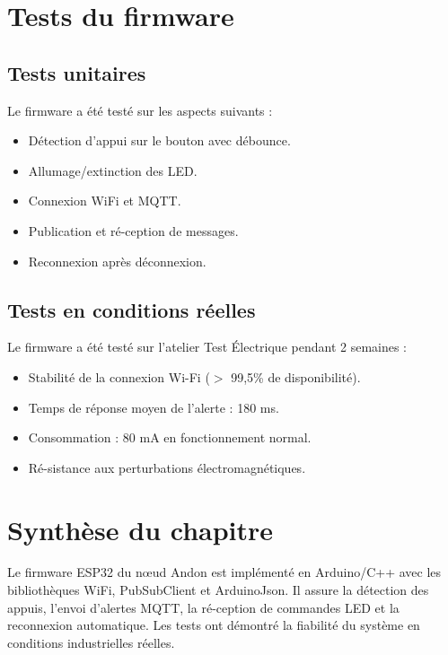 \section{Tests du firmware}

\subsection{Tests unitaires}

Le firmware a \'et\'e test\'e sur les aspects suivants :

\begin{itemize}
    \item D\'etection d'appui sur le bouton avec d\'ebounce.
    \item Allumage/extinction des LED.
    \item Connexion WiFi et MQTT.
    \item Publication et r\'e-ception de messages.
    \item Reconnexion apr\`es d\'econnexion.
\end{itemize}

\subsection{Tests en conditions r\'eelles}

Le firmware a \'et\'e test\'e sur l'atelier Test \'Electrique pendant 2 semaines :

\begin{itemize}
    \item Stabilit\'e de la connexion Wi-Fi ($>$ 99,5\% de disponibilit\'e).
    \item Temps de r\'eponse moyen de l'alerte : 180 ms.
    \item Consommation : 80 mA en fonctionnement normal.
    \item R\'e-sistance aux perturbations \'electromagn\'etiques.
\end{itemize}

\section{Synth\`ese du chapitre}

Le firmware ESP32 du n\oe{}ud Andon est impl\'ement\'e en Arduino/C++ avec les biblioth\`eques WiFi, PubSubClient et ArduinoJson. Il assure la d\'etection des appuis, l'envoi d'alertes MQTT, la r\'e-ception de commandes LED et la reconnexion automatique. Les tests ont d\'emontr\'e la fiabilit\'e du syst\`eme en conditions industrielles r\'eelles.

